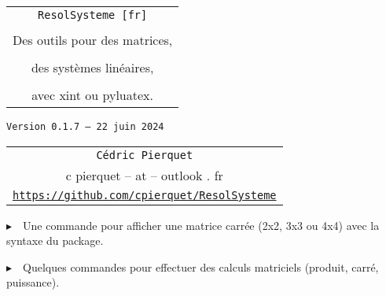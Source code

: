 \documentclass[french,a4paper,11pt]{article}
\def\TPversion{0.1.7}
\def\TPdate{22 juin 2024}
\begin{document}
\setlength{\aweboxleftmargin}{0.07\linewidth}
\setlength{\aweboxcontentwidth}{0.93\linewidth}
\setlength{\aweboxvskip}{8pt}

\pagestyle{fancy}

\thispagestyle{empty}

\vspace{2cm}

\begin{center}
	\begin{minipage}{0.75\linewidth}
	\begin{tcolorbox}[colframe=yellow,colback=yellow!15]
		\begin{center}
			\begin{tabular}{c}
				{\Huge \texttt{ResolSysteme [fr]}}\\
				\\
				{\LARGE Des outils pour des matrices, } \\
				\\
				{\LARGE des systèmes linéaires,} \\
				\\
				{\LARGE avec xint ou pyluatex.} \\
			\end{tabular}
			
			\bigskip
			
			{\small \texttt{Version \TPversion{} -- \TPdate}}
		\end{center}
	\end{tcolorbox}
\end{minipage}
\end{center}

\begin{center}
	\begin{tabular}{c}
	\texttt{Cédric Pierquet}\\
	{\ttfamily c pierquet -- at -- outlook . fr}\\
	\texttt{\url{https://github.com/cpierquet/ResolSysteme}}
\end{tabular}
\end{center}

\vspace{0.25cm}

{$\blacktriangleright$~~Une commande pour afficher une matrice carrée (2x2, 3x3 ou 4x4) avec la syntaxe du package.}

\smallskip

{$\blacktriangleright$~~Quelques commandes pour effectuer des calculs matriciels (produit, carré, puissance).}

\smallskip
\end{document}
